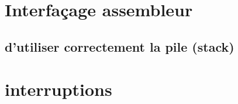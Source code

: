 

    
    
    
    
    
    

\section{Interfaçage assembleur}
\subsection{d’utiliser correctement la pile (stack)}





\section{interruptions}


